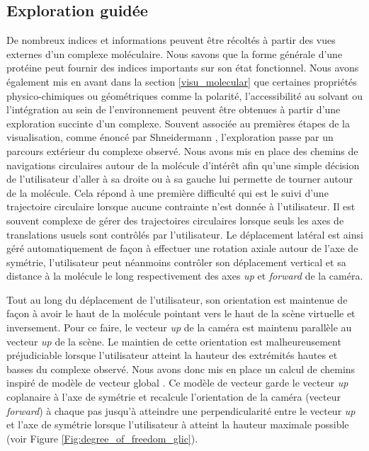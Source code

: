 \subsection{Exploration guidée}

De nombreux indices et informations peuvent être récoltés à partir des vues externes d'un complexe moléculaire. Nous savons que la forme générale d'une protéine peut fournir des indices importants sur son état fonctionnel. Nous avons également mis en avant dans la section \ref{visu_molecular} que certaines propriétés physico-chimiques ou géométriques comme la polarité, l'accessibilité au solvant ou l'intégration au sein de l'environnement peuvent être obtenues à partir d'une exploration succinte d'un complexe. Souvent associée au premières étapes de la visualisation, comme énoncé par Shneidermann \cite{shneiderman_eyes_1996}, l'exploration passe par un parcours extérieur du complexe observé. Nous avons mis en place des chemins de navigations circulaires autour de la molécule d'intérêt afin qu'une simple décision de l'utilisateur d'aller à sa droite ou à sa gauche lui permette de tourner autour de la molécule. Cela répond à une première difficulté qui est le suivi d'une trajectoire circulaire lorsque aucune contrainte n'est donnée à l'utilisateur. Il est souvent complexe de gérer des trajectoires circulaires lorsque seuls les axes de translations usuels sont contrôlés par l'utilisateur. Le déplacement latéral est ainsi géré automatiquement de façon à effectuer une rotation axiale autour de l'axe de symétrie, l'utilisateur peut néanmoins contrôler son déplacement vertical et sa distance à la molécule le long respectivement des axes \textit{up} et \textit{forward} de la caméra.

Tout au long du déplacement de l'utilisateur, son orientation est maintenue de façon à avoir le haut de la molécule pointant vers le haut de la scène virtuelle et inversement. Pour ce faire, le vecteur \textit{up} de la caméra est maintenu parallèle au vecteur \textit{up} de la scène. Le maintien de cette orientation est malheureusement préjudiciable lorsque l'utilisateur atteint la hauteur des extrémités hautes et basses du complexe observé. Nous avons donc mis en place un calcul de chemins inspiré de modèle de vecteur global \cite{khan_hovercam:_2005}. Ce modèle de vecteur garde le vecteur \textit{up} coplanaire à l'axe de symétrie et recalcule l'orientation de la caméra (vecteur \textit{forward}) à chaque pas jusqu'à atteindre une perpendicularité entre le vecteur \textit{up} et l'axe de symétrie lorsque l'utilisateur à atteint la hauteur maximale possible (voir Figure \ref{Fig:degree_of_freedom_glic}).

